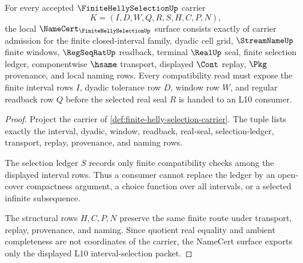 \begin{theorem}
\label{thm:finite-helly-selection-namecert-obligations}
For every accepted $\FiniteHellySelectionUp$ carrier
$$
K=(I,D,W,Q,R,S,H,C,P,N),
$$
the local $\NameCert_{\FiniteHellySelectionUp}$ surface consists exactly of carrier admission for the finite closed-interval family, dyadic cell grid, $\StreamNameUp$ finite windows, $\RegSeqRatUp$ readback, terminal $\RealUp$ seal, finite selection ledger, componentwise $\hsame$ transport, displayed $\Cont$ replay, $\Pkg$ provenance, and local naming rows. Every compatibility read must expose the finite interval rows $I$, dyadic tolerance row $D$, window row $W$, and regular readback row $Q$ before the selected real seal $R$ is handed to an L10 consumer.
\end{theorem}
\begin{proof}
Project the carrier of \autoref{def:finite-helly-selection-carrier}. The tuple lists exactly the interval, dyadic, window, readback, real-seal, selection-ledger, transport, replay, provenance, and naming rows.

The selection ledger $S$ records only finite compatibility checks among the displayed interval rows. Thus a consumer cannot replace the ledger by an open-cover compactness argument, a choice function over all intervals, or a selected infinite subsequence.

The structural rows $H,C,P,N$ preserve the same finite route under transport, replay, provenance, and naming. Since quotient real equality and ambient completeness are not coordinates of the carrier, the NameCert surface exports only the displayed L10 interval-selection packet.
\end{proof}

